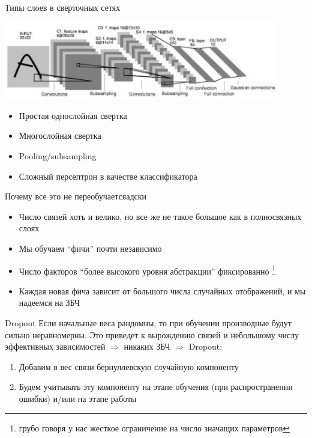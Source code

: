 \documentclass[14pt, fleqn, xcolor={dvipsnames, table}]{beamer}
\begin{document}
\begin{frame}{Типы слоев в сверточных сетях}
\begin{center}\includegraphics[width=0.9\textwidth]{convnet.png}\end{center}
\begin{itemize}
\item Простая однослойная свертка 
\item Многослойная свертка
\item Pooling/subsampling
\item Сложный персептрон в качестве классификатора
\end{itemize}
\end{frame}

\begin{frame}{Почему все это не переобучается}{адски}
\small
\begin{itemize}
  \item Число связей хоть и велико, но все же не такое большое как в полносвязных слоях
  \item Мы обучаем ``фичи'' почти независимо
  \item Число факторов ``более высокого уровня абстракции'' фиксированно \footnote{грубо говоря у нас жесткое ограничение на число значащих параметров}
  \item Каждая новая фича зависит от большого числа случайных отображений, и мы надеемся на ЗБЧ
\end{itemize}
\end{frame}

\begin{frame}{Dropout}
\small
Если начальные веса рандомны, то при обучении производные будут сильно неравномерны. Это приведет к вырождению связей и небольшому числу эффективных зависимостей $\Rightarrow$ никаких ЗБЧ $\Rightarrow$ Dropout:
\begin{enumerate}
  \item Добавим в вес связи бернуллевскую случайную компоненту
  \item Будем учитывать эту компоненту на этапе обучения (при распространении ошибки) и/или на этапе работы
\end{enumerate}
\end{frame}
\end{document}
